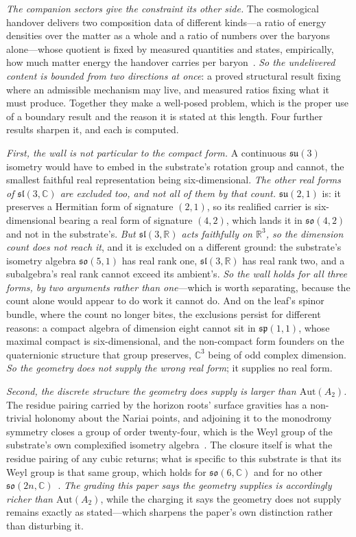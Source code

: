 \documentclass[11pt]{article}
\theoremstyle{plain}
\theoremstyle{remark}
\newcommand{\so}{\mathfrak{so}}
\newcommand{\su}{\mathfrak{su}}
\begin{document}
\emph{The companion sectors give the constraint its other side.} The cosmological handover delivers two composition data of different kinds---a ratio of energy densities over the matter as a whole and a ratio of numbers over the baryons alone---whose quotient is fixed by measured quantities and states, empirically, how much matter energy the handover carries per baryon~\cite{JanzenMatter, JanzenCRcosmology}. \emph{So the undelivered content is bounded from two directions at once}: a proved structural result fixing where an admissible mechanism may live, and measured ratios fixing what it must produce. Together they make a well-posed problem, which is the proper use of a boundary result and the reason it is stated at this length. Four further results sharpen it, and each is computed.

\emph{First, the wall is not particular to the compact form.} A continuous $\su(3)$ isometry would have to embed in the substrate's rotation group and cannot, the smallest faithful real representation being six-dimensional. \emph{The other real forms of $\mathfrak{sl}(3,\mathbb{C})$ are excluded too, and not all of them by that count.} $\mathfrak{su}(2,1)$ is: it preserves a Hermitian form of signature $(2,1)$, so its realified carrier is six-dimensional bearing a real form of signature $(4,2)$, which lands it in $\mathfrak{so}(4,2)$ and not in the substrate's. \emph{But $\mathfrak{sl}(3,\mathbb{R})$ acts faithfully on $\mathbb{R}^{3}$, so the dimension count does not reach it}, and it is excluded on a different ground: the substrate's isometry algebra $\mathfrak{so}(5,1)$ has real rank one, $\mathfrak{sl}(3,\mathbb{R})$ has real rank two, and a subalgebra's real rank cannot exceed its ambient's. \emph{So the wall holds for all three forms, by two arguments rather than one}---which is worth separating, because the count alone would appear to do work it cannot do. And on the leaf's spinor bundle, where the count no longer bites, the exclusions persist for different reasons: a compact algebra of dimension eight cannot sit in $\mathfrak{sp}(1,1)$, whose maximal compact is six-dimensional, and the non-compact form founders on the quaternionic structure that group preserves, $\mathbb{C}^{3}$ being of odd complex dimension. \emph{So the geometry does not supply the wrong real form}; it supplies no real form.

\emph{Second, the discrete structure the geometry does supply is larger than $\mathrm{Aut}(A_2)$.} The residue pairing carried by the horizon roots' surface gravities has a non-trivial holonomy about the Nariai points, and adjoining it to the monodromy symmetry closes a group of order twenty-four, which is the Weyl group of the substrate's own complexified isometry algebra~\cite{JanzenGroupoid, JanzenAlgebroid}. The closure itself is what the residue pairing of any cubic returns; what is specific to this substrate is that its Weyl group is that same group, which holds for $\so(6,\mathbb{C})$ and for no other $\so(2n,\mathbb{C})$~\cite{JanzenMatter}. \emph{The grading this paper says the geometry supplies is accordingly richer than $\mathrm{Aut}(A_2)$}, while the charging it says the geometry does not supply remains exactly as stated---which sharpens the paper's own distinction rather than disturbing it.
\end{document}
